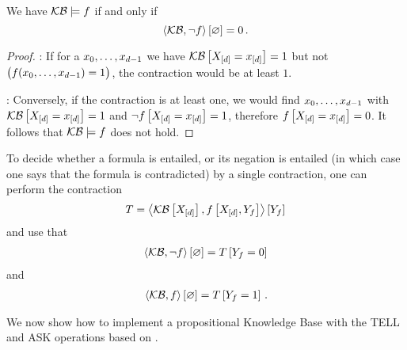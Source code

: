 %






\begin{theorem}\label{the:contCriterionLogEntailment}
	We have $\mathcal{KB}\models f$ if and only if
		\[ \left\langle \mathcal{KB},\lnot f\right\rangle \left[ \varnothing \right] = 0 \, . \]
\end{theorem}
\begin{proof}
	\proofleftsymbol:
	If for a ${x_{0},\ldots,x_{d-1}}$ we have $\mathcal{KB}\left[X_{[d]}=x_{[d]}\right]=1$ but not $\big(f({x_{0},\ldots,x_{d-1}})=1\big)$, the contraction would be at least $1$.

	\proofrightsymbol:
	Conversely, if the contraction is at least one, we would find ${x_{0},\ldots,x_{d-1}}$ with $\mathcal{KB}\left[X_{[d]}=x_{[d]}\right]=1$ and $\lnot f\left[X_{[d]}=x_{[d]}\right]=1$, therefore $f\left[X_{[d]}=x_{[d]}\right]=0$. 
	It follows that $\mathcal{KB}\models f$ does not hold.
\end{proof}

To decide whether a formula is entailed, or its negation is entailed (in which case one says that the formula is contradicted) by a single contraction, one can perform the contraction
\begin{align*}
	T = \left\langle \mathcal{KB}\left[X_{[d]}\right],f\left[X_{[d]},Y_{f}\right]\right\rangle \left[ Y_{f} \right]
\end{align*}
and use that
\begin{align*}
	 \left\langle \mathcal{KB},\lnot f\right\rangle \left[ \varnothing \right] = T\left[Y_{f}=0\right] 
\end{align*}
and 
\begin{align*}
	 \left\langle \mathcal{KB},f\right\rangle \left[ \varnothing \right] = T\left[Y_{f}=1\right] \, .  
\end{align*}







We now show how to implement a propositional Knowledge Base with the TELL and ASK operations based on .

